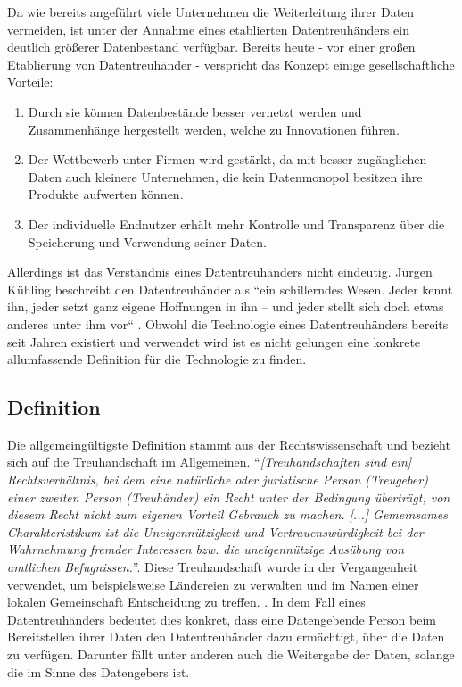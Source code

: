 \documentclass{scrreprt}
\begin{document}
Da wie bereits angeführt viele Unternehmen die Weiterleitung ihrer Daten vermeiden, ist unter der Annahme eines etablierten Datentreuhänders ein deutlich größerer Datenbestand verfügbar. Bereits heute - vor einer großen Etablierung von Datentreuhänder - verspricht das Konzept einige gesellschaftliche Vorteile: \cite{dt-richter2020ddvtalk}
\begin{enumerate}
    \item Durch sie können Datenbestände besser vernetzt werden und Zusammenhänge hergestellt werden, welche zu Innovationen führen.
    \item Der Wettbewerb unter Firmen wird gestärkt, da mit besser zugänglichen Daten auch kleinere Unternehmen, die kein Datenmonopol besitzen ihre Produkte aufwerten können.
    \item Der individuelle Endnutzer erhält mehr Kontrolle und Transparenz über die Speicherung und Verwendung seiner Daten.
\end{enumerate}

Allerdings ist das Verständnis eines Datentreuhänders nicht eindeutig. Jürgen Kühling beschreibt den Datentreuhänder als ``ein schillerndes Wesen. Jeder kennt ihn, jeder setzt ganz eigene Hoffnungen in ihn – und jeder stellt sich doch etwas anderes unter ihm vor`` \cite{dt-kuhling2021datentreuhander}. Obwohl die Technologie eines Datentreuhänders bereits seit Jahren existiert und verwendet wird \cite{dt-hardinges2018data} ist es nicht gelungen eine konkrete allumfassende Definition für die Technologie zu finden.

\subsection{Definition}
Die allgemeingültigste Definition stammt aus der Rechtswissenschaft und bezieht sich auf die Treuhandschaft im Allgemeinen. ``\textit{[Treuhandschaften sind ein] Rechtsverhältnis, bei dem eine natürliche oder juristische Person (Treugeber) einer zweiten Person (Treuhänder) ein Recht unter der Bedingung überträgt, von diesem Recht nicht zum eigenen Vorteil Gebrauch zu machen. [...] Gemeinsames Charakteristikum ist die Uneigennützigkeit und Vertrauenswürdigkeit bei der Wahrnehmung fremder Interessen bzw. die uneigennützige Ausübung von amtlichen Befugnissen.}''\cite{dt-beeck2013treuhandschaft}. Diese Treuhandschaft wurde in der Vergangenheit verwendet, um beispielsweise Ländereien zu verwalten und im Namen einer lokalen Gemeinschaft Entscheidung zu treffen. \cite{dt-hardinges2018data}. In dem Fall eines Datentreuhänders bedeutet dies konkret, dass eine Datengebende Person beim Bereitstellen ihrer Daten den Datentreuhänder dazu ermächtigt, über die Daten zu verfügen. Darunter fällt unter anderen auch die Weitergabe der Daten, solange die im Sinne des Datengebers ist. 
\end{document}
